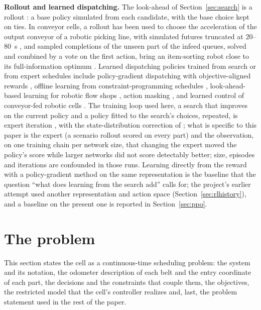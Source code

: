 \documentclass[11pt,a4paper]{article}
\theoremstyle{plain}
\theoremstyle{definition}
\theoremstyle{remark}
\begin{document}
\textbf{Rollout and learned dispatching.} The look-ahead of Section~\ref{sec:search} is a
rollout \cite{M02_Bertsekas1997}: a base policy simulated from each candidate, with the
base choice kept on ties. In conveyor cells, a rollout has been used to choose the
acceleration of the output conveyor of a robotic picking line, with simulated futures
truncated at 20--80~s \cite{Righettini2025}, and sampled completions of the unseen part of
the infeed queues, solved and combined by a vote on the first action, bring an item-sorting
robot close to its full-information optimum \cite{Li2026}. Learned dispatching policies trained from search or from expert
schedules include policy-gradient dispatching with objective-aligned rewards
\cite{S19_Zhang2020,S21_Sun2023}, offline learning from constraint-programming schedules
\cite{S20_VanRemmerden2025}, look-ahead-based learning for robotic flow shops
\cite{S14_Kim2023}, action masking \cite{M04_Huang2022,S18_Wei2024}, and learned control
of conveyor-fed robotic cells \cite{S15_Zisgen2025,S16_Drijver2023,S17_Drakaki2017,S12_Wang2004,S13_Li2020}.
The training loop used here, a search that improves on the current policy and a policy
fitted to the search's choices, repeated, is expert iteration \cite{Anthony2017,Silver2018},
with the state-distribution correction of \cite{Ross2011}; what is specific to this paper
is the expert (a scenario rollout scored on every part) and the observation, on one
training chain per network size, that changing the expert moved the policy's score while
larger networks did not score detectably better; size, episodes and iterations are confounded in
those runs. Learning directly from the reward with a
policy-gradient method \cite{Schulman2017} on the same representation is the baseline
that the question ``what does learning from the search add'' calls for; the project's
earlier attempt used another representation and action space (Section~\ref{sec:rlhistory}),
and a baseline on the present one is reported in Section~\ref{sec:ppo}.

\section{The problem}\label{sec:problem}

This section states the cell as a continuous-time scheduling problem: the system and its notation, the odometer description of each belt and the entry coordinate of each part, the decisions and the constraints that couple them, the objectives, the restricted model that the cell's controller realizes and, last, the problem statement used in the rest of the paper.
\end{document}

